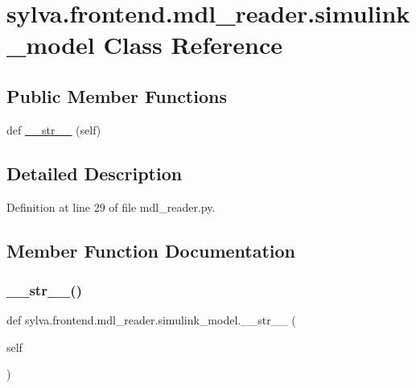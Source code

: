 \hypertarget{classsylva_1_1frontend_1_1mdl__reader_1_1simulink__model}{}\section{sylva.\+frontend.\+mdl\+\_\+reader.\+simulink\+\_\+model Class Reference}
\label{classsylva_1_1frontend_1_1mdl__reader_1_1simulink__model}
\subsection*{Public Member Functions}
\begin{DoxyCompactItemize}
\item 
def \hyperlink{classsylva_1_1frontend_1_1mdl__reader_1_1simulink__model_a17e0d6eb4150b7509b3c1bb47b5c0a13}{\+\_\+\+\_\+str\+\_\+\+\_\+} (self)
\end{DoxyCompactItemize}


\subsection{Detailed Description}


Definition at line 29 of file mdl\+\_\+reader.\+py.



\subsection{Member Function Documentation}
\mbox{\label{classsylva_1_1frontend_1_1mdl__reader_1_1simulink__model_a17e0d6eb4150b7509b3c1bb47b5c0a13}} 
\subsubsection{\texorpdfstring{\+\_\+\+\_\+str\+\_\+\+\_\+()}{\_\_str\_\_()}}
{\footnotesize\ttfamily def sylva.\+frontend.\+mdl\+\_\+reader.\+simulink\+\_\+model.\+\_\+\+\_\+str\+\_\+\+\_\+ (\begin{DoxyParamCaption}\item[{}]{self }\end{DoxyParamCaption})}



